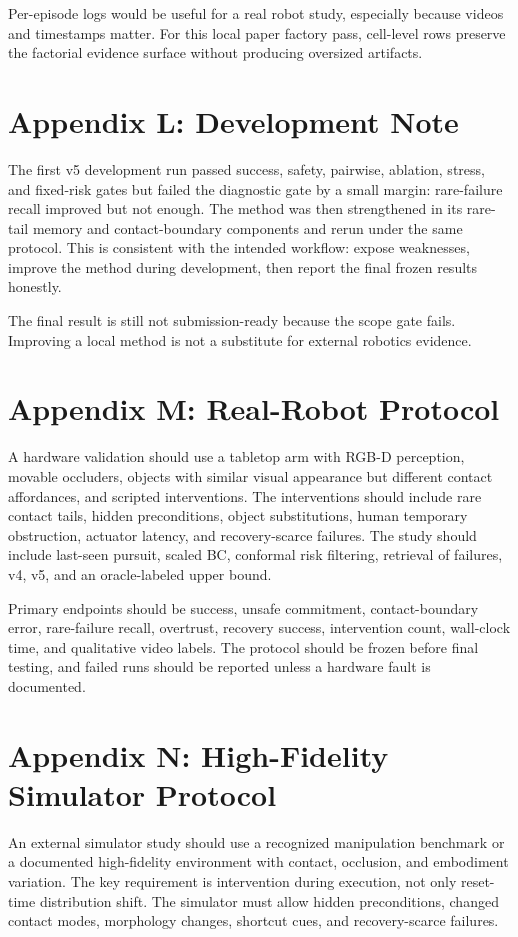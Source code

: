 \documentclass{article}
\begin{document}
Per-episode logs would be useful for a real robot study, especially because videos and timestamps matter. For this local paper factory pass, cell-level rows preserve the factorial evidence surface without producing oversized artifacts.


\section{Appendix L: Development Note}
The first v5 development run passed success, safety, pairwise, ablation, stress, and fixed-risk gates but failed the diagnostic gate by a small margin: rare-failure recall improved but not enough. The method was then strengthened in its rare-tail memory and contact-boundary components and rerun under the same protocol. This is consistent with the intended workflow: expose weaknesses, improve the method during development, then report the final frozen results honestly.

The final result is still not submission-ready because the scope gate fails. Improving a local method is not a substitute for external robotics evidence.


\section{Appendix M: Real-Robot Protocol}
A hardware validation should use a tabletop arm with RGB-D perception, movable occluders, objects with similar visual appearance but different contact affordances, and scripted interventions. The interventions should include rare contact tails, hidden preconditions, object substitutions, human temporary obstruction, actuator latency, and recovery-scarce failures. The study should include last-seen pursuit, scaled BC, conformal risk filtering, retrieval of failures, v4, v5, and an oracle-labeled upper bound.

Primary endpoints should be success, unsafe commitment, contact-boundary error, rare-failure recall, overtrust, recovery success, intervention count, wall-clock time, and qualitative video labels. The protocol should be frozen before final testing, and failed runs should be reported unless a hardware fault is documented.


\section{Appendix N: High-Fidelity Simulator Protocol}
An external simulator study should use a recognized manipulation benchmark or a documented high-fidelity environment with contact, occlusion, and embodiment variation. The key requirement is intervention during execution, not only reset-time distribution shift. The simulator must allow hidden preconditions, changed contact modes, morphology changes, shortcut cues, and recovery-scarce failures.
\end{document}
